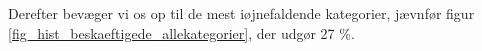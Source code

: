 Derefter bevæger vi os op til de mest iøjnefaldende kategorier, jævnfør figur \ref{fig_hist_beskaeftigede_allekategorier}, der udgør 27 \%.

\label{ledighedsrisiko} %


















 





























